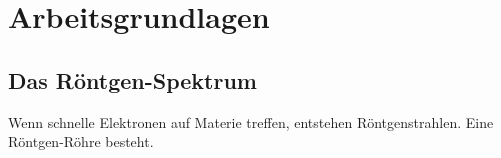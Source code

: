 \chapter{Arbeitsgrundlagen}
\setcounter{page}{1} \thispagestyle{fancy} 
\section{Das Röntgen-Spektrum}
Wenn schnelle Elektronen auf Materie treffen, entstehen Röntgenstrahlen. Eine Röntgen-Röhre besteht.